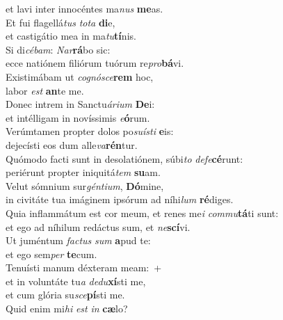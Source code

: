 \oddverse et lavi inter innocéntes ma\textit{nus} \textbf{me}as.\\
\evenverse Et fui flagellá\textit{tus} \textit{to}\textit{ta} \textbf{di}e,~\*\\
\evenverse et castigátio mea in ma\textit{tu}\textbf{tí}nis.\\
\oddverse Si di\textit{cé}\textit{bam}: \textit{Nar}\textbf{rá}bo sic:~\*\\
\oddverse ecce natiónem filiórum tuórum re\textit{pro}\textbf{bá}vi.\\
\evenverse Existimábam ut \textit{co}\textit{gnó}\textit{sce}\textbf{rem} hoc,~\*\\
\evenverse labor \textit{est} \textbf{an}te me.\\
\oddverse Donec intrem in Sanctu\textit{á}\textit{ri}\textit{um} \textbf{De}i:~\*\\
\oddverse et intélligam in novíssimis \textit{e}\textbf{ó}rum.\\
\evenverse Verúmtamen propter dolos po\textit{su}\textit{í}\textit{sti} \textbf{e}is:~\*\\
\evenverse dejecísti eos dum alle\textit{va}\textbf{rén}tur.\\
\oddverse Quómodo facti sunt in desolatiónem, súbi\textit{to} \textit{de}\textit{fe}\textbf{cé}runt:~\*\\
\oddverse periérunt propter iniquitá\textit{tem} \textbf{su}am.\\
\evenverse Velut sómnium sur\textit{gén}\textit{ti}\textit{um}, \textbf{Dó}mine,~\*\\
\evenverse in civitáte tua imáginem ipsórum ad níhi\textit{lum} \textbf{ré}diges.\\
\oddverse Quia inflammátum est cor meum, et renes me\textit{i} \textit{com}\textit{mu}\textbf{tá}ti sunt:~\*\\
\oddverse et ego ad níhilum redáctus sum, et \textit{ne}\textbf{scí}vi.\\
\evenverse Ut juméntum \textit{fa}\textit{ctus} \textit{sum} \textbf{a}pud te:~\*\\
\evenverse et ego sem\textit{per} \textbf{te}cum.\\
\oddverse Tenuísti manum déxteram meam:~+\\
\oddverse  et in voluntáte tu\textit{a} \textit{de}\textit{du}\textbf{xí}sti me,~\*\\
\oddverse et cum glória su\textit{sce}\textbf{pí}sti me.\\
\evenverse Quid enim mi\textit{hi} \textit{est} \textit{in} \textbf{cæ}lo?~\*\\
